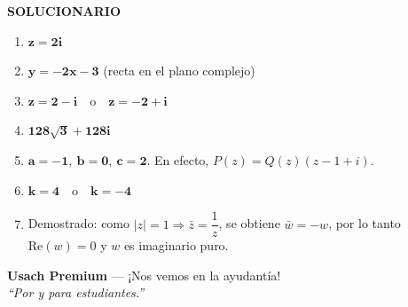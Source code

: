\documentclass[letterpaper, 12pt]{article}
\newenvironment{solbox}[1]{%
    \begin{tcolorbox}[colback=celesteSuave, colframe=azulFuerte,
        title=\textbf{#1}, fonttitle=\bfseries]
}{%
    \end{tcolorbox}
}
\newenvironment{ejercicios}{}{}
\newenvironment{soluciones}{%
    \newpage
    \begin{center}
        \begin{tcolorbox}[colback=azulFuerte, colframe=azulFuerte,
            colupper=white, width=0.8\textwidth, center, arc=10pt]
            \centering\Large\textbf{SOLUCIONARIO}
        \end{tcolorbox}
    \end{center}
    \footnotesize
}{}
\begin{document}
\begin{ejercicios}
\begin{soluciones}
\vspace{0.5cm}

\begin{solbox}{III. Respuestas - Números Complejos}
\begin{enumerate}[label=\color{azulFuerte}\bfseries\arabic*), leftmargin=*, itemsep=0.6em]
    \item $\mathbf{z = 2i}$
 
    \item $\mathbf{y = -2x - 3}$ (recta en el plano complejo)
 
    \item $\mathbf{z = 2 - i} \quad \text{o} \quad \mathbf{z = -2 + i}$
 
    \item $\mathbf{128\sqrt{3} + 128i}$
 
    \item $\mathbf{a=-1,\ b=0,\ c=2}$. En efecto,
    $P(z)=Q(z)(z-1+i)$.
    
    \item $\mathbf{k = 4} \quad \text{o} \quad \mathbf{k = -4}$

    \item Demostrado: como $|z|=1 \Rightarrow \bar z = \dfrac{1}{z}$, se obtiene $\bar w = -w$, por lo tanto $\text{Re}(w) = 0$ y $w$ es imaginario puro.

\end{enumerate}
\end{solbox}
 
\vspace{0.8cm}
\begin{center}
    \small\textbf{Usach Premium} — ¡Nos vemos en la ayudantía! \\
    \textit{``Por y para estudiantes.''}
\end{center}
 
\end{soluciones}
 
\end{ejercicios}
\end{document}
